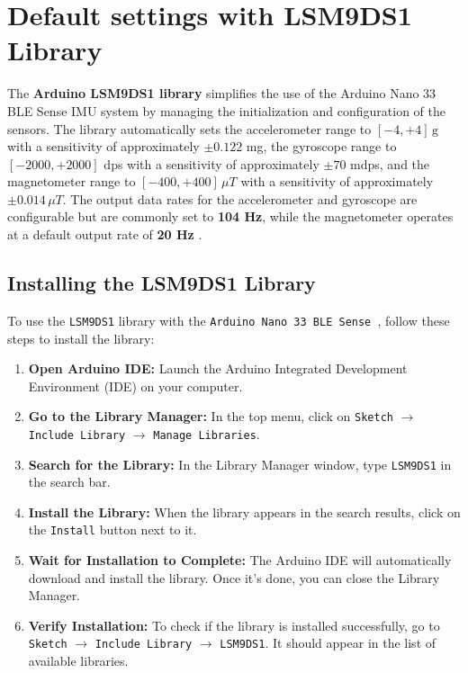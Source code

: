 %
%
%
%

\section{Default settings with  LSM9DS1 Library}


The \textbf{Arduino LSM9DS1 library} simplifies the use of the Arduino Nano 33 BLE Sense IMU system by managing the initialization and configuration of the sensors. The library automatically sets the accelerometer range to \([-4, +4]\,\text{g}\) with a sensitivity of approximately \(\pm 0.122\) mg, the gyroscope range to \([-2000, +2000]\) dps with a sensitivity of approximately \(\pm 70\) mdps, and the magnetometer range to \([-400, +400] \, \mu T\) with a sensitivity of approximately \(\pm 0.014 \, \mu T\). The output data rates for the accelerometer and gyroscope are configurable but are commonly set to \textbf{104 Hz}, while the magnetometer operates at a default output rate of \textbf{20 Hz} \cite{Arduino:2024h}.

\subsection{Installing the LSM9DS1 Library}

To use the \texttt{LSM9DS1} library with the \texttt{Arduino Nano 33 BLE Sense }, follow these steps to install the library:

\begin{enumerate}
    \item \textbf{Open Arduino IDE:}
    Launch the Arduino Integrated Development Environment (IDE) on your computer.
    
    \item \textbf{Go to the Library Manager:}
    In the top menu, click on \texttt{Sketch} $\rightarrow$ \texttt{Include Library} $\rightarrow$ \texttt{Manage Libraries}.
    
    \item \textbf{Search for the Library:}
    In the Library Manager window, type \texttt{LSM9DS1} in the search bar.
    
    \item \textbf{Install the Library:}
    When the library appears in the search results, click on the \texttt{Install} button next to it.
    
    \item \textbf{Wait for Installation to Complete:}
    The Arduino IDE will automatically download and install the library. Once it's done, you can close the Library Manager.
    
    \item \textbf{Verify Installation:}
    To check if the library is installed successfully, go to \texttt{Sketch} $\rightarrow$ \texttt{Include Library} $\rightarrow$ \texttt{LSM9DS1}. It should appear in the list of available libraries.
\end{enumerate}

